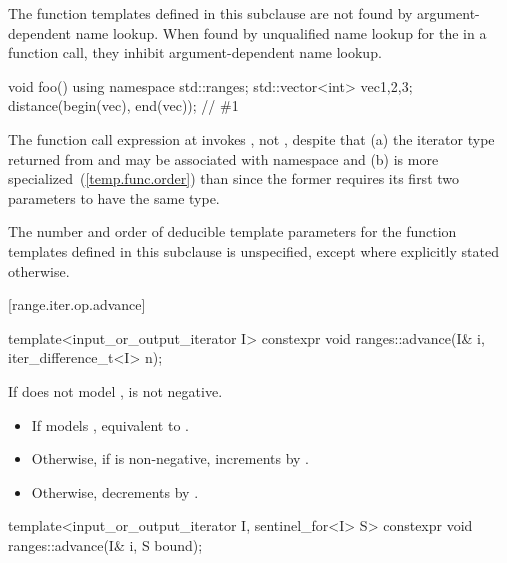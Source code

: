 \pnum
The function templates defined in this subclause are not found by
argument-dependent name lookup. When found by
unqualified name lookup for the
 in a function call, they
inhibit argument-dependent name lookup.

\begin{example}
\begin{codeblock}
void foo() {
    using namespace std::ranges;
    std::vector<int> vec{1,2,3};
    distance(begin(vec), end(vec));     // \#1
}
\end{codeblock}
The function call expression at  invokes ,
not , despite that
(a) the iterator type returned from  and 
may be associated with namespace  and
(b)  is more specialized~(\ref{temp.func.order}) than
 since the former requires its first two parameters
to have the same type.
\end{example}

\pnum
The number and order of deducible template parameters for the function templates defined
in this subclause is unspecified, except where explicitly stated otherwise.

[range.iter.op.advance]{}

%
\begin{itemdecl}
template<input_or_output_iterator I>
  constexpr void ranges::advance(I& i, iter_difference_t<I> n);
\end{itemdecl}

\begin{itemdescr}
\pnum
\expects
If  does not model ,
 is not negative.

\pnum
\effects
\begin{itemize}
\item If  models ,
  equivalent to .
\item Otherwise, if  is non-negative, increments
   by .
\item Otherwise, decrements  by .
\end{itemize}
\end{itemdescr}

%
\begin{itemdecl}
template<input_or_output_iterator I, sentinel_for<I> S>
  constexpr void ranges::advance(I& i, S bound);
\end{itemdecl}

